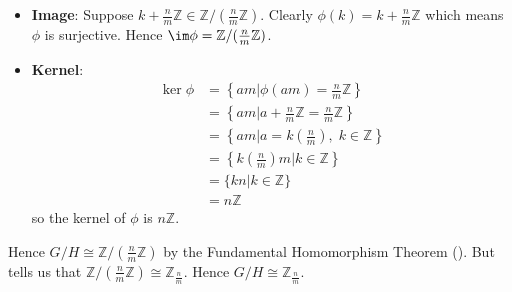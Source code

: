 \begin{enumerate}
\begin{itemize}
        \item \textbf{Image}: Suppose $k + \frac nm \mathbb{Z} \in \mathbb{Z}/(\frac nm \mathbb{Z})$. Clearly $\phi(k) = k + \frac nm \mathbb{Z}$ which means $\phi$ is surjective. Hence $\im\phi = \mathbb{Z}/(\frac nm \mathbb{Z})$.
        
        \item \textbf{Kernel}:
        \begin{align*}
            \ker\phi &= \left\{am \vert \phi(am) = \frac nm \mathbb{Z}\right\}\\
            &= \left\{am \vert a + \frac nm \mathbb{Z} = \frac nm \mathbb{Z}\right\}\\
            &= \left\{am \vert a  = k\left(\frac nm\right),\; k \in \mathbb{Z}\right\}\\
            &= \left\{k\left(\frac nm\right)m \vert k \in \mathbb{Z}\right\}\\
            &= \{kn \vert k \in \mathbb{Z}\}\\
            &= n\mathbb{Z}
        \end{align*}
        so the kernel of $\phi$ is $n\mathbb{Z}$.
    \end{itemize}
    Hence $G/H \cong \mathbb{Z}/(\frac nm \mathbb{Z})$ by the Fundamental Homomorphism Theorem (). But  tells us that $\mathbb{Z}/(\frac nm \mathbb{Z}) \cong \mathbb{Z}_{\frac nm}$. Hence $G/H \cong \mathbb{Z}_{\frac nm}$.
\end{enumerate}

